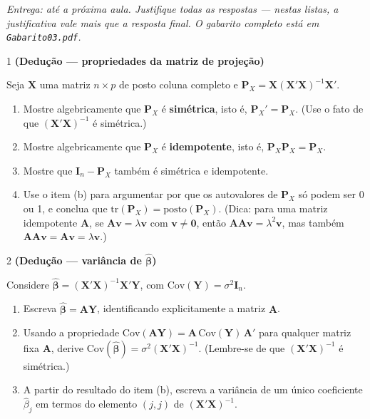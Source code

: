\documentclass[11pt]{article}
\begin{document}

\noindent \textit{Entrega: até a próxima aula. Justifique todas as respostas --- nestas listas, a
justificativa vale mais que a resposta final. O gabarito completo está em \texttt{Gabarito03.pdf}.}

\begin{questao}{1} \textbf{(Dedução --- propriedades da matriz de projeção)}

Seja $\mathbf{X}$ uma matriz $n \times p$ de posto coluna completo e $\mathbf{P}_X =
\mathbf{X}(\mathbf{X}'\mathbf{X})^{-1}\mathbf{X}'$.

\begin{enumerate}[label=(\alph*)]
  \item Mostre algebricamente que $\mathbf{P}_X$ é \textbf{simétrica}, isto é,
    $\mathbf{P}_X' = \mathbf{P}_X$. (Use o fato de que $(\mathbf{X}'\mathbf{X})^{-1}$ é simétrica.)
  \item Mostre algebricamente que $\mathbf{P}_X$ é \textbf{idempotente}, isto é,
    $\mathbf{P}_X\mathbf{P}_X = \mathbf{P}_X$.
  \item Mostre que $\mathbf{I}_n - \mathbf{P}_X$ também é simétrica e idempotente.
  \item Use o item (b) para argumentar por que os autovalores de $\mathbf{P}_X$ só podem ser 0 ou
    1, e conclua que $\mathrm{tr}(\mathbf{P}_X) = \mathrm{posto}(\mathbf{P}_X)$. (Dica: para uma
    matriz idempotente $\mathbf{A}$, se $\mathbf{A}\mathbf{v} = \lambda\mathbf{v}$ com
    $\mathbf{v}\neq\mathbf{0}$, então $\mathbf{A}\mathbf{A}\mathbf{v} = \lambda^2\mathbf{v}$, mas
    também $\mathbf{A}\mathbf{A}\mathbf{v}=\mathbf{A}\mathbf{v}=\lambda \mathbf{v}$.)
\end{enumerate}
\end{questao}

\begin{questao}{2} \textbf{(Dedução --- variância de $\hat{\boldsymbol\beta}$)}

Considere $\hat{\boldsymbol\beta} = (\mathbf{X}'\mathbf{X})^{-1}\mathbf{X}'\mathbf{Y}$, com
$\mathrm{Cov}(\mathbf{Y}) = \sigma^2\mathbf{I}_n$.

\begin{enumerate}[label=(\alph*)]
  \item Escreva $\hat{\boldsymbol\beta} = \mathbf{A}\mathbf{Y}$, identificando explicitamente a
    matriz $\mathbf{A}$.
  \item Usando a propriedade $\mathrm{Cov}(\mathbf{A}\mathbf{Y}) = \mathbf{A}\,\mathrm{Cov}(\mathbf{Y})\,\mathbf{A}'$
    para qualquer matriz fixa $\mathbf{A}$, derive $\mathrm{Cov}(\hat{\boldsymbol\beta}) =
    \sigma^2(\mathbf{X}'\mathbf{X})^{-1}$. (Lembre-se de que $(\mathbf{X}'\mathbf{X})^{-1}$ é
    simétrica.)
  \item A partir do resultado do item (b), escreva a variância de um único coeficiente
    $\hat\beta_j$ em termos do elemento $(j,j)$ de $(\mathbf{X}'\mathbf{X})^{-1}$.
\end{enumerate}
\end{questao}
\end{document}
